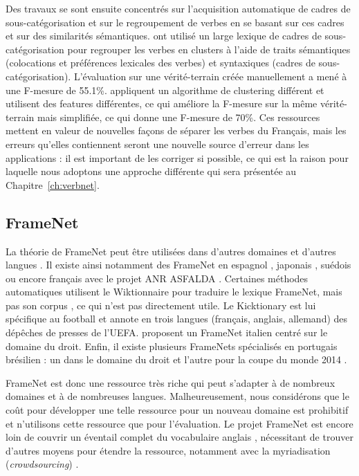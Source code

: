 Des travaux se sont ensuite concentrés sur l'acquisition automatique de cadres
de sous-catégorisation et sur le regroupement de verbes en se basant sur ces
cadres et sur des similarités sémantiques. \cite{sun2010investigating} ont
utilisé un large lexique de cadres de sous-catégorisation
\citep{messiant2010acquisition} pour regrouper les verbes en clusters à l'aide
de traits sémantiques (colocations et préférences lexicales des verbes) et
syntaxiques (cadres de sous-catégorisation).  L'évaluation sur une
vérité-terrain créée manuellement a mené à une F-mesure de 55.1\%.
\cite{falk2012classifying} appliquent un algorithme de clustering différent et
utilisent des features différentes, ce qui améliore la F-mesure sur la même
vérité-terrain mais simplifiée, ce qui donne une F-mesure de 70\%.  Ces
ressources mettent en valeur de nouvelles façons de séparer les verbes du
Français, mais les erreurs qu'elles contiennent seront une nouvelle source
d'erreur dans les applications : il est important de les corriger si possible,
ce qui est la raison pour laquelle nous adoptons une approche différente qui
sera présentée au Chapitre~\ref{ch:verbnet}.

\subsection{FrameNet}
\label{traduction_framenet}

La théorie de FrameNet peut être utilisées dans d'autres domaines et d'autres
langues \citep{boas2009multilingual}. Il existe ainsi notamment des FrameNet en
espagnol \citep{subirats2003surprise}, japonais \citep{ohara2004japanese},
suédois \citep{heppin2012rocky} ou encore français avec le projet ANR ASFALDA
\citep{candito2014developing}. Certaines méthodes automatiques utilisent le
Wiktionnaire pour traduire le lexique FrameNet, mais pas son corpus
\citep{mouton2010framenet,hartmann2013framenet}, ce qui n'est pas directement
utile. Le Kicktionary \citep{schmidt2009kicktionary} est lui spécifique au
football et annote en trois langues (français, anglais, allemand) des dépêches
de presses de l'UEFA.  \cite{venturi2009towards} proposent un FrameNet italien
centré sur le domaine du droit. Enfin, il existe plusieurs FrameNets
spécialisés en portugais brésilien : un dans le domaine du droit
\citep{bertoldi2012frame} et l'autre pour la coupe du monde 2014
\citep{torrent2014copa}.

FrameNet est donc une ressource très riche qui peut s'adapter à de nombreux
domaines et à de nombreuses langues. Malheureusement, nous considérons que le
coût pour développer une telle ressource pour un nouveau domaine est prohibitif
et n'utilisons cette ressource que pour l'évaluation. Le projet FrameNet est
encore loin de couvrir un éventail complet du vocabulaire anglais
\citep[§5.4]{marquez2008semantic}, nécessitant de trouver d'autres moyens pour
étendre la ressource, notamment avec la myriadisation (\textit{crowdsourcing})
\citep{fossati2013outsourcing,baker2014framenet}.

